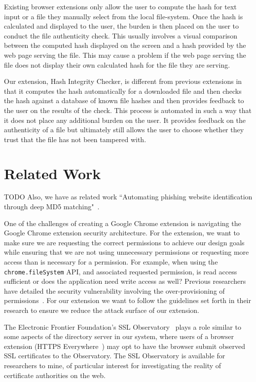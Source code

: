 \documentclass[letterpaper,twocolumn,10pt]{article}
\begin{document}
Existing browser extensions only allow the user to compute the hash for text input or a file they manually select from the local file-system. Once the hash is calculated and displayed to the user, the burden is then placed on the user to conduct the file authenticity check. This usually involves a visual comparison between the computed hash displayed on the screen and a hash provided by the web page serving the file. This may cause a problem if the web page serving the file does not display their own calculated hash for the file they are serving.

Our extension, Hash Integrity Checker, is different from previous extensions in that it computes the hash automatically for a downloaded file and then checks the hash against a database of known file hashes and then provides feedback to the user on the results of the check. This process is automated in such a way that it does not place any additional burden on the user. It provides feedback on the authenticity of a file but ultimately still allows the user to choose whether they trust that the file has not been tampered with.

\section{Related Work}

TODO Also, we have as related work ``Automating phishing website identification through deep MD5 matching"~\cite{Wardman}.

One of the challenges of creating a Google Chrome extension is navigating the Google Chrome extension security architecture. For the extension, we want to make sure we are requesting the correct permissions to achieve our design goals while ensuring that we are not using unnecessary permissions or requesting more access than is necessary for a permission. For example, when using the \texttt{chrome.fileSystem} API, and associated requested permission, is read access sufficient or does the application need write access as well? Previous researchers have detailed the security vulnerability involving the over-provisioning of permissions~\cite{180206}. For our extension we want to follow the guidelines set forth in their research to ensure we reduce the attack surface of our extension.

The Electronic Frontier Foundation's SSL Observatory~\cite{ssl-observatory} plays a role
similar to some aspects of the directory server in our system, where users of a browser
extension (HTTPS Everywhere~\cite{https-everywhere}) may opt to have the browser
submit observed SSL certificates to the Observatory. The SSL Observatory is available for
researchers to mine, of particular interest for investigating the reality of certificate authorities
on the web.
\end{document}
